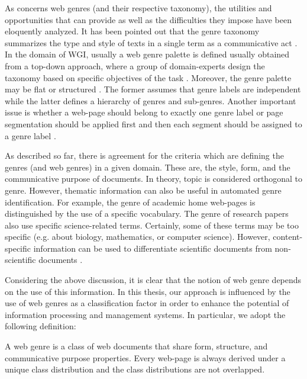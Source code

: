 As concerns web genres (and their respective taxonomy), the utilities and opportunities that can provide as well as the difficulties they impose have been eloquently analyzed. It has been pointed out that the genre taxonomy summarizes the type and style of texts in a single term as a communicative act \parencite{de2009genre}. In the domain of WGI, usually a web genre palette is defined usually obtained from a top-down approach, where a group of domain-experts design the taxonomy based on specific objectives of the task \parencite{crowston2011problems}. Moreover, the genre palette may be flat or structured \parencite{wu2010fine}. The former assumes that genre labels are independent while the latter defines a hierarchy of genres and sub-genres. Another important issue is whether a web-page should belong to exactly one genre label or page segmentation should be applied first and then each segment should be assigned to a genre label  \parencite{madjarov2015web,jebari2015combination}.  

As described so far, there is agreement for the criteria which are defining the genres (and web genres) in a given domain. These are, the style, form, and the communicative purpose of documents. In theory, topic is considered orthogonal to genre. However, thematic information can also be useful in automated genre identification. For example, the genre of academic home web-pages is distinguished by the use of a specific vocabulary. The genre of research papers also use specific science-related terms. Certainly, some of these terms may be too specific (e.g. about biology, mathematics, or computer science). However, content-specific information can be used to differentiate scientific documents from non-scientific documents \parencite{coutinho2009describe,crowston2011problems,kanaris2009learning,jebari2015combination,gollapalli2011identifying}. 

Considering the above discussion, it is clear that the notion of web genre depends on the use of this information. In this thesis, our approach is influenced by the use of web genres as a classification factor in order to enhance the potential of information processing and management systems. In particular, we adopt the following definition:

\begin{definition} A web genre is a class of web documents that share form, structure, and communicative purpose properties. Every web-page is always derived under a unique class distribution and the class distributions are not overlapped.
\end{definition}

